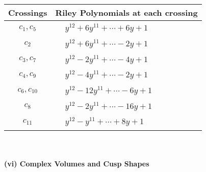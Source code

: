 \documentclass[1p]{elsarticle_modified}
\theoremstyle{definition}
\begin{document}
\begin{tabular}{m{50pt}|m{274pt}}
Crossings & \hspace{64pt}Riley Polynomials at each crossing \\
\hline $$\begin{aligned}c_{1},c_{5}\end{aligned}$$&$\begin{aligned}
&y^{12}+6 y^{11}+\cdots+6 y+1
\end{aligned}$\\
\hline $$\begin{aligned}c_{2}\end{aligned}$$&$\begin{aligned}
&y^{12}+6 y^{11}+\cdots-2 y+1
\end{aligned}$\\
\hline $$\begin{aligned}c_{3},c_{7}\end{aligned}$$&$\begin{aligned}
&y^{12}-2 y^{11}+\cdots-4 y+1
\end{aligned}$\\
\hline $$\begin{aligned}c_{4},c_{9}\end{aligned}$$&$\begin{aligned}
&y^{12}-4 y^{11}+\cdots-2 y+1
\end{aligned}$\\
\hline $$\begin{aligned}c_{6},c_{10}\end{aligned}$$&$\begin{aligned}
&y^{12}-12 y^{11}+\cdots-6 y+1
\end{aligned}$\\
\hline $$\begin{aligned}c_{8}\end{aligned}$$&$\begin{aligned}
&y^{12}-2 y^{11}+\cdots-16 y+1
\end{aligned}$\\
\hline $$\begin{aligned}c_{11}\end{aligned}$$&$\begin{aligned}
&y^{12}- y^{11}+\cdots+8 y+1
\end{aligned}$\\
\hline
\end{tabular}\\~\\
\newpage\flushleft \textbf{(vi) Complex Volumes and Cusp Shapes}
\end{document}
